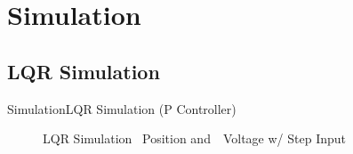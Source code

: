 \documentclass{beamer}
\begin{document}

\section{Simulation}

\subsection{LQR Simulation}

\begin{frame}{Simulation}{LQR Simulation (P Controller)}
    \begin{figure}
      \centering
      \caption{LQR Simulation ~Position and~~Voltage w/ Step Input}
      \label{fig:LQR_Sim_Con}
    \end{figure}
\end{frame}
\end{document}
